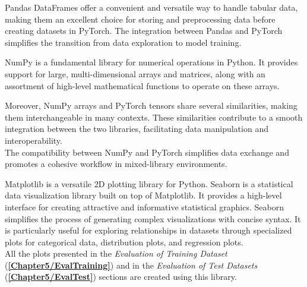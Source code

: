 Pandas DataFrames offer a convenient and versatile way to handle tabular data, making them an excellent choice for storing and preprocessing data before creating datasets in PyTorch. The integration between Pandas and PyTorch simplifies the transition from data exploration to model training.

NumPy is a fundamental library for numerical operations in Python. It provides support for large, multi-dimensional arrays and matrices, along with an assortment of high-level mathematical functions to operate on these arrays.

Moreover, NumPy arrays and PyTorch tensors share several similarities, making them interchangeable in many contexts. These similarities contribute to a smooth integration between the two libraries, facilitating data manipulation and interoperability.\\
The compatibility between NumPy and PyTorch simplifies data exchange and promotes a cohesive workflow in mixed-library environments.

Matplotlib is a versatile 2D plotting library for Python. Seaborn is a statistical data visualization library built on top of Matplotlib. It provides a high-level interface for creating attractive and informative statistical graphics. Seaborn simplifies the process of generating complex visualizations with concise syntax. It is particularly useful for exploring relationships in datasets through specialized plots for categorical data, distribution plots, and regression plots.\\
All the plots presented in the \textit{Evaluation of Training Dataset} (\textbf{\ref{Chapter5/EvalTraining}}) and in the \textit{Evaluation of Test Datasets} (\textbf{\ref{Chapter5/EvalTest}}) sections are created using this library.
